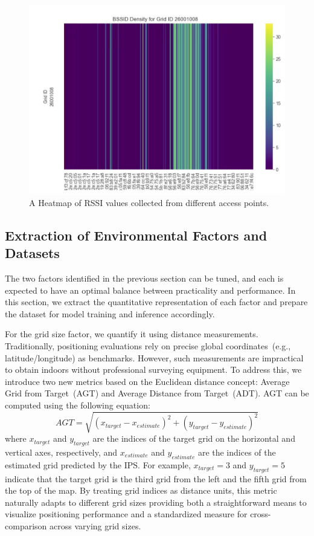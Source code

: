 \documentclass[runningheads]{llncs}
\begin{document}
\begin{figure}[th!]
        \centering
        \includegraphics[width=0.7\linewidth]{figures/meth3.jpg}
        \caption{A Heatmap of RSSI values collected from different access points.}
        \label{fig:heatmap}
\end{figure}

\subsection{Extraction of Environmental Factors and Datasets}\label{ssec:extraction}

The two factors identified in the previous section can be tuned, and each is expected to have an optimal balance between practicality and performance. In this section, we extract the quantitative representation of each factor and prepare the dataset for model training and inference accordingly.

For the grid size factor, we quantify it using distance measurements. Traditionally, positioning evaluations rely on precise global coordinates~(e.g., latitude/longitude) as benchmarks. However, such measurements are impractical to obtain indoors without professional surveying equipment. To address this, we introduce two new metrics based on the Euclidean distance concept: Average Grid from Target~(AGT) and Average Distance from Target~(ADT). AGT can be computed using the following equation:
\begin{equation}
        AGT = \sqrt{(x_{target} - x_{estimate})^2 + (y_{target} - y_{estimate})^2}
        \label{eq:agt}
\end{equation}
where $x_{target}$ and $y_{target}$ are the indices of the target grid on the horizontal and vertical axes, respectively, and $x_{estimate}$ and $y_{estimate}$ are the indices of the estimated grid predicted by the IPS. For example, $x_{target} = 3$ and $y_{target} = 5$ indicate that the target grid is the third grid from the left and the fifth grid from the top of the map. By treating grid indices as distance units, this metric naturally adapts to different grid sizes providing both a straightforward means to visualize positioning performance and a standardized measure for cross-comparison across varying grid sizes. 
\end{document}
